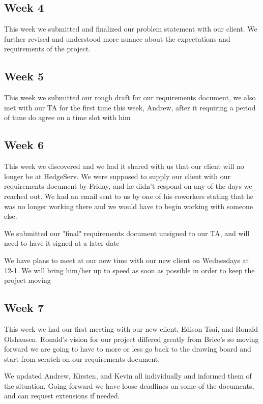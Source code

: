 \documentclass[onecolumn, draftclsnofoot,10pt, compsoc]{IEEEtran}
\begin{document}
    
    \subsection{Week 4}
    This week we submitted and finalized our problem statement with our client. We further revised and understood more nuance about the expectations and requirements of the project.

    
    \subsection{Week 5}
       This week we submitted our rough draft for our requirements document, we also met with our TA for the first time this week, Andrew, after it requiring a period of time do agree on a time slot with him 
    
    \subsection{Week 6}
        This week we discovered and we had it shared with us that our client will no longer be at HedgeServ. We were supposed to supply our client with our requirements document by Friday, and he didn't respond on any of the days we reached out. We had an email sent to us by one of his coworkers stating that he was no longer working there and we would have to begin working with someone else. 
 
        We submitted our "final" requirements document unsigned to our TA, and will need to have it signed at a later date 
        
        We have plans to meet at our new time with our new client on Wednesdays at 12-1. We will bring him/her up to speed as soon as possible in order to keep the project moving 
            
    
    \subsection{Week 7}
        This week we had our first meeting with our new client, Edison Tsai, and Ronald Olshausen. Ronald's vision for our project differed greatly from Brice's so moving forward we are going to have to more or less go back to the drawing board and start from scratch on our requirements document, 
 
        We updated Andrew, Kirsten, and Kevin all individually and informed them of the situation. Going forward we have loose deadlines on some of the documents, and can request extensions if needed. 
 
\end{document}
